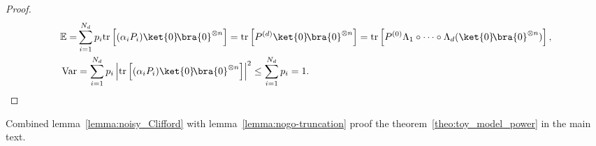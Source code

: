 \documentclass[aps,%
twocolumn,%
floatfix,%
pra,%
amsfonts,%
longbibliography,%
groupedaddress,%
superscriptaddress]{revtex4-2}%
\newcommand{\1}{\mathbbm{1}}
\begin{document}
\begin{proof}
    \begin{align}
        \mathbb{E} = &\sum_{i = 1}^{N_d} p_i \text{tr}\left[(\alpha_iP_i) \ket{0}\!\bra{0}^{\otimes n}\right] =\text{tr}\left[P^{(d)} \ket{0}\!\bra{0}^{\otimes n}\right] = \text{tr}\left[P^{(0)}\Lambda_1 \circ \cdots \circ \Lambda_{d}(\ket{0}\!\bra{0}^{\otimes n})\right],\\
        \text{Var} &= \sum_{i = 1}^{N_d} p_i \left|\text{tr}\left[(\alpha_iP_i) \ket{0}\!\bra{0}^{\otimes n}\right]\right|^2 \leq \sum_{i = 1}^{N_d} p_i = 1.
    \end{align}
\end{proof}

Combined lemma~\ref{lemma:noisy_Clifford} with lemma~\ref{lemma:nogo-truncation} proof the theorem~\ref{theo:toy_model_power} in the main text. 
\end{document}
